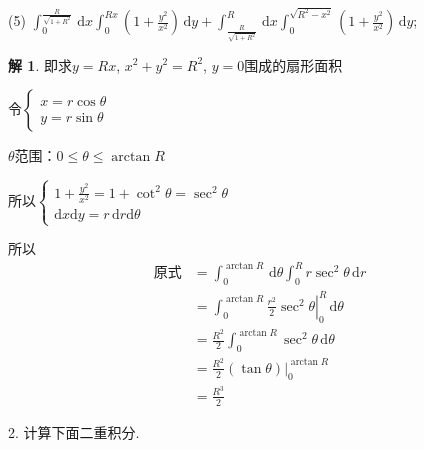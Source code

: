 \documentclass[a4paper,12pt]{article}
\theoremstyle{definition}
\newtheorem*{sol}{解}
\begin{document}
(5) $\displaystyle\int_{0}^{\frac{R}{\sqrt{1+R^2}}}\,\mathrm{d}x \int_{0}^{Rx} \left(1 + \frac{y^2}{x^2}\right)\,\mathrm{d}y + \int_{\frac{R}{\sqrt{1+R^2}}}^{R}\,\mathrm{d}x \int_{0}^{\sqrt{R^2 - x^2}} \left(1 + \frac{y^2}{x^2}\right)\,\mathrm{d}y$;
\begin{sol}
    即求$y=Rx$, $x^2+y^2=R^2$, $y=0$围成的扇形面积

    令$\begin{cases}
            x=r\cos\theta \\
            y=r\sin\theta
        \end{cases}$

    $\theta$范围：$0\leq\theta\leq\arctan R$

    所以$\begin{cases}
            1+\frac{y^2}{x^2}=1+\cot^2\theta=\sec^2\theta \\
            \mathrm{d}x\mathrm{d}y=r\,\mathrm{d}r\mathrm{d}\theta
        \end{cases}$

    所以
    \begin{align*}
        \text{原式}
         & =\int_0^{\arctan R}\,\mathrm{d}\theta\int_0^Rr\sec^2\theta\,\mathrm{d}r         \\
         & =\int_0^{\arctan R}\left.\frac{r^2}{2}\sec^2\theta\right|_0^R\,\mathrm{d}\theta \\
         & =\frac{R^2}{2}\int_0^{\arctan R}\sec^2\theta\,\mathrm{d}\theta                  \\
         & =\frac{R^2}{2}\left.(\tan\theta)\right|_0^{\arctan R}                           \\
         & =\frac{R^3}{2}
    \end{align*}
\end{sol}


2. 计算下面二重积分.
\end{document}
